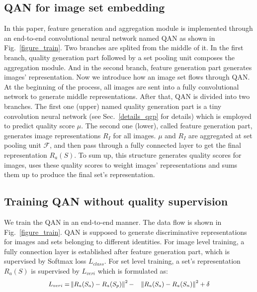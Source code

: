 \subsection{QAN for image set embedding}
In this paper, feature generation and aggregation module is implemented through an end-to-end convolutional neural network named QAN as shown in Fig.~\ref{figure_train}. Two branches are splited from the middle of it. In the first branch, quality generation part followed by a set pooling unit composes the aggregation module. And in the second branch, feature generation part  generates images' representation. Now we introduce how an image set flows through QAN. At the beginning of the process, all images are sent into a fully convolutional network to generate middle representations. After that,
QAN is divided into two branches. The first one (upper) named quality generation part is a tiny convolution neural network (see Sec.~\ref{details_qgp} for details) which is employed to predict quality score $\mu$. The second one (lower), called feature generation part,  generates image representations $R_I$ for all images. $\mu$ and $R_I$ are aggregated at set pooling unit $\mathcal{F}$, and then pass through a fully connected layer to get the final representation $R_a(S)$. To sum up, this structure generates quality scores for images, uses these quality scores to weight images' representations and sums them up to produce the final set's representation.

\subsection{Training QAN without quality supervision}
\label{end2endtrain}
We train the QAN in an end-to-end manner. The data flow is shown in Fig.~\ref{figure_train}. QAN is supposed to generate discriminative representations for images and sets belonging to different identities. For image level training, a fully connection layer is established after feature generation part, which is supervised by Softmax loss $L_{class}$. For set level training, a set's representation $R_a(S)$ is supervised by $L_{veri}$ which is formulated as:
\begin{equation}
\small
\begin{aligned}
\label{7}
L_{veri} = &\left \lVert R_a(S_a)-R_a(S_p) \right \rVert^2 - &\left \lVert R_a(S_a)- R_a(S_n) \right \rVert^2 + \delta
\end{aligned}
\end{equation}


